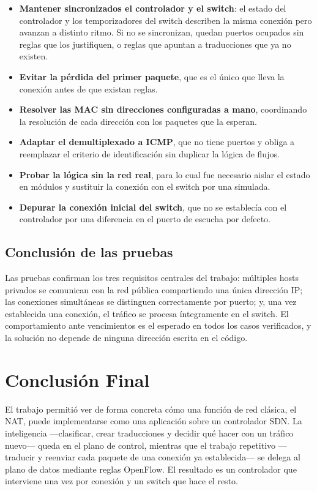﻿\documentclass[10pt,a4paper]{article}
\begin{document}
\begin{itemize}[nosep]
    \item \textbf{Mantener sincronizados el controlador y el switch}: el estado del
          controlador y los temporizadores del switch describen la misma conexión pero
          avanzan a distinto ritmo. Si no se sincronizan, quedan puertos ocupados sin
          reglas que los justifiquen, o reglas que apuntan a traducciones que ya no
          existen.
    \item \textbf{Evitar la pérdida del primer paquete}, que es el único que lleva la
          conexión antes de que existan reglas.
    \item \textbf{Resolver las MAC sin direcciones configuradas a mano}, coordinando la
          resolución de cada dirección con los paquetes que la esperan.
    \item \textbf{Adaptar el demultiplexado a ICMP}, que no tiene puertos y obliga a
          reemplazar el criterio de identificación sin duplicar la lógica de flujos.
    \item \textbf{Probar la lógica sin la red real}, para lo cual fue necesario aislar
          el estado en módulos y sustituir la conexión con el switch por una simulada.
    \item \textbf{Depurar la conexión inicial del switch}, que no se establecía con el
          controlador por una diferencia en el puerto de escucha por defecto.
\end{itemize}

\subsection{Conclusión de las pruebas}

Las pruebas confirman los tres requisitos centrales del trabajo: múltiples hosts
privados se comunican con la red pública compartiendo una única dirección IP; las
conexiones simultáneas se distinguen correctamente por puerto; y, una vez establecida
una conexión, el tráfico se procesa íntegramente en el switch. El comportamiento ante
vencimientos es el esperado en todos los casos verificados, y la solución no depende
de ninguna dirección escrita en el código.

\section{Conclusión Final}
El trabajo permitió ver de forma concreta cómo una función de red clásica, el NAT,
puede implementarse como una aplicación sobre un controlador SDN. La inteligencia
---clasificar, crear traducciones y decidir qué hacer con un tráfico nuevo--- queda en
el plano de control, mientras que el trabajo repetitivo ---traducir y reenviar cada
paquete de una conexión ya establecida--- se delega al plano de datos mediante reglas
OpenFlow. El resultado es un controlador que interviene una vez por conexión y un
switch que hace el resto.
\end{document}
